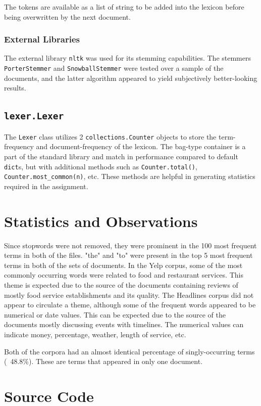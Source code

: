 \documentclass[11pt]{article}
\begin{document}
The tokens are available as a list of string to be added into the lexicon before being overwritten by the next document.

\subsubsection{External Libraries}
The external library \texttt{nltk} was used for its stemming capabilities. The stemmers \texttt{PorterStemmer} and \texttt{SnowballStemmer} were tested over a sample of the documents, and the latter algorithm appeared to yield subjectively better-looking results.

\subsection{\texttt{lexer.Lexer}}
The \texttt{Lexer} class utilizes 2 \texttt{collections.Counter} objects to store the term-frequency and document-frequency of the lexicon. The bag-type container is a part of the standard library and match in performance compared to default \texttt{dict}s, but with additional methods such as \texttt{Counter.total()}, \texttt{Counter.most\_common(n)}, etc. These methods are helpful in generating statistics required in the assignment.

\section{Statistics and Observations}
Since stopwords were not removed, they were prominent in the 100 most frequent terms in both of the files. "the" and "to" were present in the top 5 most frequent terms in both of the sets of documents. In the Yelp corpus, some of the most commonly occurring words were related to food and restaurant services. This theme is expected due to the source of the documents containing reviews of mostly food service establishments and its quality. The Headlines corpus did not appear to circulate a theme, although some of the frequent words appeared to be numerical or date values. This can be expected due to the source of the documents mostly discussing events with timelines. The numerical values can indicate money, percentage, weather, length of service, etc.

Both of the corpora had an almost identical percentage of singly-occurring terms (~48.8\%). These are terms that appeared in only one document.

\appendix

\section{Source Code} \label{appendix:src}


\end{document}
